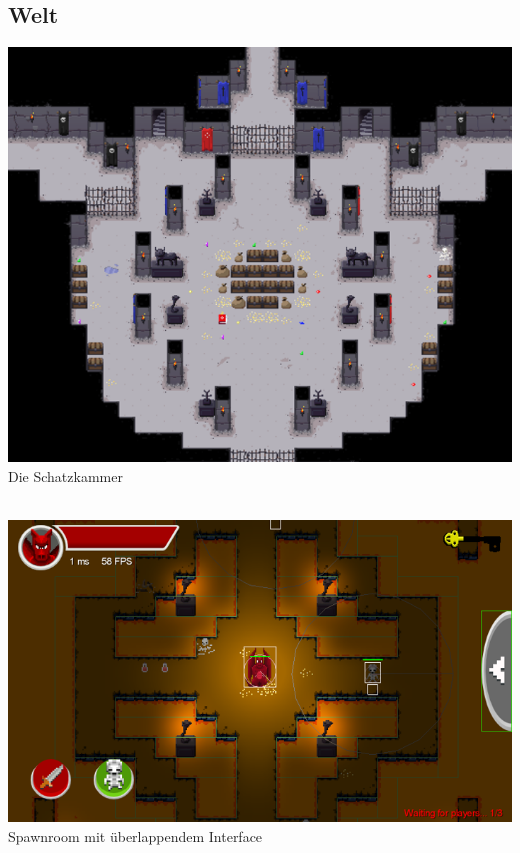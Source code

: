 \documentclass[10pt,a4paper,notitlepage]{scrreprt}
\begin{document}
			\subsection{Welt}
				\begin{center}
						\includegraphics[scale=0.8]{maze.png}\\
					Die Schatzkammer\\\
			
					\includegraphics[scale=0.8]{mazewithui.png}\\
					Spawnroom mit überlappendem Interface\\
				\end{center}
			
\end{document}
